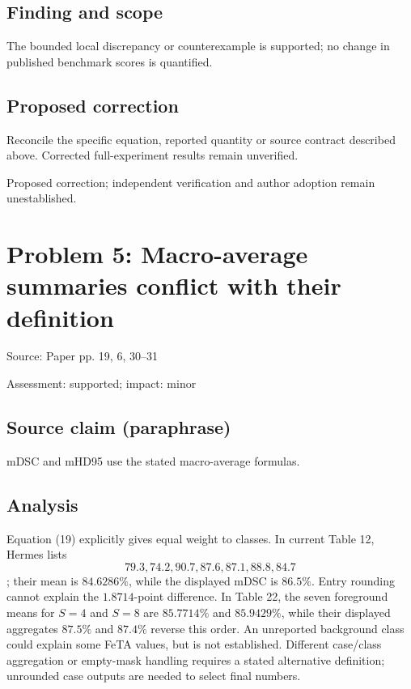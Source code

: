 \documentclass[11pt]{article}
\begin{document}
\subsection*{Finding and scope}

The bounded local discrepancy or counterexample is supported; no change in published benchmark scores is quantified.

\subsection*{Proposed correction}

Reconcile the specific equation, reported quantity or source contract described above. Corrected full-experiment results remain unverified.

Proposed correction; independent verification and author adoption remain unestablished.

\section*{Problem 5: Macro-average summaries conflict with their definition}

Source: Paper pp. 19, 6, 30–31

Assessment: supported; impact: minor

\subsection*{Source claim (paraphrase)}

mDSC and mHD95 use the stated macro-average formulas.

\subsection*{Analysis}

Equation (19) explicitly gives equal weight to classes. In current Table 12, Hermes lists \[79.3,74.2,90.7,87.6,87.1,88.8,84.7\]; their mean is \(84.6286\%\), while the displayed mDSC is \(86.5\%\). Entry rounding cannot explain the \(1.8714\)-point difference. In Table 22, the seven foreground means for \(S=4\) and \(S=8\) are \(85.7714\%\) and \(85.9429\%\), while their displayed aggregates \(87.5\%\) and \(87.4\%\) reverse this order. An unreported background class could explain some FeTA values, but is not established. Different case/class aggregation or empty-mask handling requires a stated alternative definition; unrounded case outputs are needed to select final numbers.
\end{document}
